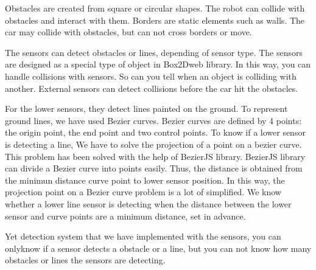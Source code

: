 Obstacles are created from square or circular shapes. The robot can collide with obstacles and interact with them. Borders are static elements such as walls. The car may collide with obstacles, but can not cross borders or move.


%


The sensors can detect obstacles or lines, depending of sensor type. The sensors are designed as a special type of object in Box2Dweb library. In this way, you can handle collisions with sensors. So can you tell when an object is colliding with another. External sensors can detect collisions before the car hit the obstacles. 

For the lower sensors, they detect lines painted on the ground. To represent ground lines, we have used Bezier curves. Bezier curves are defined by 4 points: the origin point, the end point and two control points. To know if a lower sensor is detecting a line, We have to solve the projection of a point on a bezier curve. This problem has been solved with the help of BezierJS library. BezierJS library can divide a Bezier curve into points easily. Thus, the distance is obtained from the minimun distance curve point to lower sensor position. In this way, the projection point on a Bezier curve problem is a lot of simplified. We know whether a lower line sensor is detecting when the distance between the lower sensor and curve points are a minimum distance, set in advance.

Yet detection system that we have implemented with the sensors, you can onlyknow if a sensor detects a obstacle or a line, but you can not know how many obstacles or lines the sensors are detecting.

